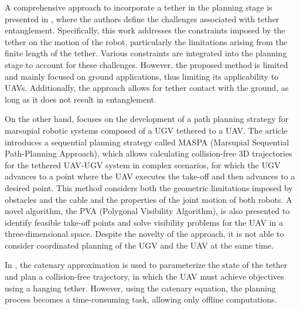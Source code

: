 
A comprehensive approach to incorporate a tether in the planning stage is presented in \cite{battocletti2024entanglementdefinitionstetheredrobots}, where the authors define the challenges associated with tether entanglement. Specifically, this work addresses the constraints imposed by the tether on the motion of the robot, particularly the limitations arising from the finite length of the tether. Various constraints are integrated into the planning stage to account for these challenges. However, the proposed method is limited and mainly focused on ground applications, 
thus limiting its applicability to UAVs. Additionally, the approach allows for tether contact with the ground, as long as it does not result in entanglement.

On the other hand, \cite{capitán2024efficientstrategypathplanning} focuses on the development of a path planning strategy for marsupial robotic systems composed of a UGV tethered to a UAV. The article introduces a sequential planning strategy called MASPA (Marsupial Sequential Path-Planning Approach), which allows calculating collision-free 3D trajectories for the tethered UAV-UGV system in complex scenarios, for which the UGV advances to a point where the UAV executes the take-off and then advances to a desired point. This method considers both the geometric limitations imposed by obstacles and the cable and the properties of the joint motion of both robots. A novel algorithm, the PVA (Polygonal Visibility Algorithm), is also presented to identify feasible take-off points and solve visibility problems for the UAV in a three-dimensional space. Despite the novelty of the approach, it is not able to consider coordinated planning of the UGV and the UAV at the same time.

In \cite{smartinezr2023}, the catenary approximation is used to parameterize the state of the tether and plan a collision-free trajectory, in which the UAV must achieve objectives using a hanging tether. However, using the catenary equation, the planning process becomes a time-consuming task, allowing only offline computations. %

